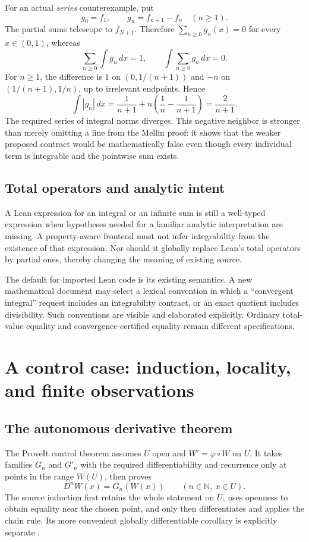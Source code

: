 \documentclass[11pt,a4paper]{article}
\newcommand{\N}{\mathbb N}\newcommand{\Z}{\mathbb Z}
\theoremstyle{plain}\newtheorem{proposition}{Proposition}[section]
\theoremstyle{definition}\newtheorem{definition}[proposition]{Definition}
\theoremstyle{remark}\newtheorem{remark}[proposition]{Remark}
\begin{document}
For an actual \emph{series} counterexample, put
\[
 g_0=f_1,\qquad g_n=f_{n+1}-f_n\quad(n\ge1).
\]
The partial sums telescope to \(f_{N+1}\). Therefore \(\sum_{n\ge0}g_n(x)=0\) for every \(x\in(0,1)\), whereas
\[
 \sum_{n\ge0}\int g_n\,dx=1,
 \qquad
 \int\sum_{n\ge0}g_n\,dx=0.
\]
For \(n\ge1\), the difference is \(1\) on \((0,1/(n+1))\) and \(-n\) on \((1/(n+1),1/n)\), up to irrelevant endpoints. Hence
\[
 \int|g_n|\,dx=\frac1{n+1}
 +n\left(\frac1n-\frac1{n+1}\right)=\frac2{n+1}.
\]
The required series of integral norms diverges. This negative neighbor is stronger than merely omitting a line from the Mellin proof: it shows that the weaker proposed contract would be mathematically false even though every individual term is integrable and the pointwise sum exists.

\subsection{Total operators and analytic intent}
A Lean expression for an integral or an infinite sum is still a well-typed expression when hypotheses needed for a familiar analytic interpretation are missing. A property-aware frontend must not infer integrability from the existence of that expression. Nor should it globally replace Lean's total operators by partial ones, thereby changing the meaning of existing source.

The default for imported Lean code is its existing semantics. A new mathematical document may select a lexical convention in which a ``convergent integral'' request includes an integrability contract, or an exact quotient includes divisibility. Such conventions are visible and elaborated explicitly. Ordinary total-value equality and convergence-certified equality remain different specifications.

\section{A control case: induction, locality, and finite observations}\label{sec:analysis}
\subsection{The autonomous derivative theorem}
The ProveIt control theorem assumes \(U\) open and \(W'=\varphi\circ W\) on \(U\). It takes families \(G_n\) and \(G'_n\) with the required differentiability and recurrence only at points in the range \(W(U)\), then proves
\[
 D^nW(x)=G_n(W(x))\qquad(n\in\N,\ x\in U).
\]
The source induction first retains the whole statement on \(U\), uses openness to obtain equality near the chosen point, and only then differentiates and applies the chain rule. Its more convenient globally differentiable corollary is explicitly separate \cite{autonomous}.
\end{document}
